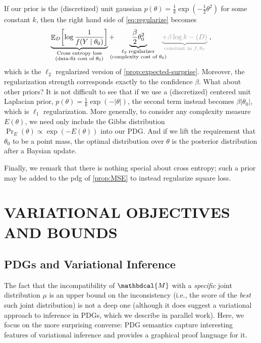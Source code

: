 \documentclass[twoside]{article}
\theoremstyle{plain}
\theoremstyle{definition}
\let\H\relax
\DeclareMathOperator{\H}{\mathrm{H}} %
\DeclareMathOperator*{\Ex}{\mathbb{E}} %
\newcommand{\dg}[1]{\mathbdcal{#1}}
\begin{document}
If our prior is the (discretized) unit gaussian $p(\theta) \!=\! \frac{1}{k} \exp(-\frac12 \theta^2)$ for some constant $k$, then the right hand side of \eqref{eq:regularize} becomes
\[ \underbrace{\Ex\nolimits_{D}\! \left[\log \frac{1}{f(Y \mid \theta_0)} \right]}
	_{\substack{\text{Cross entropy loss}\\(\text{data-fit cost of $\theta_0$})}}%
	+ \!\!\!\!\!\underbrace{~\frac\beta2 \theta_0^2~}_{\substack{\ell_2 \text{ regularizer}\\(\text{complexity cost of $\theta_0$})}} \!\!\!\!\!
	{\color{gray!80} \underbrace{+ \beta \log k - \H(D)}_{\text{constant in $f, \theta_0$}}}\;, \]
which is the $\ell_2$ regularized version of \cref{prop:expected-surprise}.
Moreover, the regularization strength corresponds exactly to the confidence $\beta$.
What about other priors? It is not difficult to see that if we use a (discretized) centered unit Laplacian prior, $p(\theta) = \frac1k \exp(-|\theta|)$, the second term instead becomes $\beta |\theta_0|$, which is $\ell_1$ regularization.
More generally, to consider any complexity measure $E(\theta)$, we need only include the Gibbs distribution $\Pr_E(\theta) \propto \exp(-E(\theta))$ into our PDG.
And if we lift the requirement that $\theta_0$ to be a point mass, the optimal distribution over $\theta$ is the posterior distribution after a Baysian update.

Finally, we remark that there is nothing special about cross entropy; such a prior may be added to the pdg of \cref{prop:MSE} to instead regularize square loss.

\section{VARIATIONAL OBJECTIVES AND BOUNDS}
\label{sec:theory}

\subsection{PDGs and Variational Inference}
\label{sec:variational}




The fact that the incompatibility of $\dg M$ with a \emph{specific} joint distribution $\mu$ is an upper bound on the inconsistency (i.e., the score of the \emph{best} such joint distribution) is not a deep one (although it does suggest a variational approach to inference in PDGs, which we describe in parallel work).
Here, we focus on the more surprising converse:  PDG semantics capture interesting features of variational inference and provides a graphical proof language for it.
\end{document}
